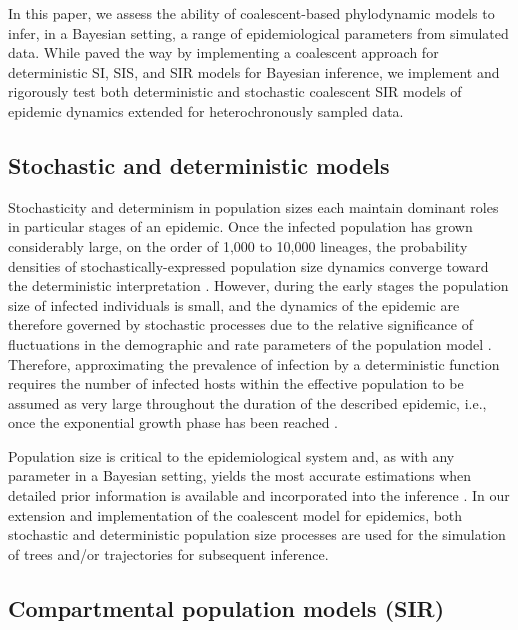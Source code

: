 \documentclass[12pt,titlepage]{article}
\begin{document}
In this paper, we assess the ability of coalescent-based phylodynamic models to infer, in a Bayesian setting, a range of epidemiological parameters from simulated data.  
While \cite{DearloveandWilson} paved the way by implementing a coalescent approach for deterministic SI, SIS, and SIR models for Bayesian inference, 
we implement and rigorously test both deterministic and stochastic coalescent SIR models of epidemic dynamics extended for heterochronously sampled data.

\subsection{Stochastic and deterministic models}

Stochasticity and determinism in population sizes each maintain dominant roles in particular stages 
of an epidemic.  Once the infected population has grown considerably large, on the order 
of 1,000 to 10,000 lineages, the probability densities of stochastically-expressed 
population size dynamics converge toward the deterministic interpretation \citep{Rouzine:2001}. However, 
during the early stages the population size of infected individuals is small, and the 
dynamics of the epidemic are therefore governed by stochastic processes due to the 
relative significance of fluctuations in the demographic and rate parameters of the 
population model \citep{Kuhnert:2014}.  Therefore, approximating the prevalence of infection by a deterministic function requires the 
number of infected hosts within the effective population to be assumed as very large 
throughout the duration of the described epidemic, i.e., once the exponential growth phase 
has been reached \citep{Rouzine:2001}.

Population size is critical to the epidemiological system and, as with any parameter in a 
Bayesian setting, yields the most accurate estimations when detailed prior information 
is available and incorporated into the inference \citep{Drummond:2006}.   
In our extension and implementation of the coalescent model for epidemics, both stochastic and deterministic population size
processes are used for the simulation of trees and/or trajectories for subsequent inference.

\subsection{Compartmental population models (SIR)}
\end{document}
